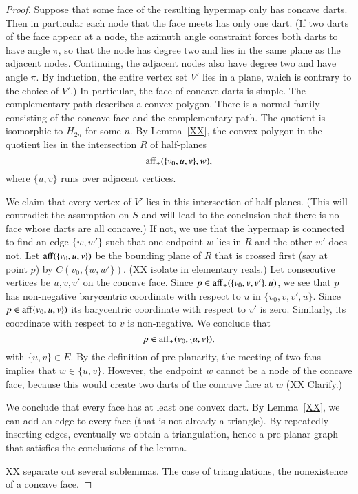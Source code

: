 \begin{proof}
Suppose that some face of the resulting hypermap only has concave darts.  Then
in particular each node that the face meets has only one dart.  (If two darts
of the face appear at a node, the azimuth angle constraint forces both darts to
have angle $\pi$, so that the node has degree two and lies in the same plane
as the adjacent nodes.  Continuing, the adjacent nodes also have degree two and
have angle $\pi$.  By induction, the entire vertex set $V'$ lies in a plane, which
is contrary to the choice of $V'$.)   In particular, the face of concave darts
is simple.   The complementary path describes a convex polygon.  There
is a normal family consisting of the concave face and the complementary path.
The quotient is isomorphic to $H_{2n}$ for some $n$.  By Lemma~\ref{XX}, the
convex polygon in the quotient lies in the intersection $R$ of half-planes
$$
{\operatorname{aff}}_+(\{v_0,u,v\},w),
$$
where $\{u,v\}$ runs over adjacent vertices.  

We claim that every vertex of $V'$ lies in this intersection of half-planes.
(This will contradict the assumption on $S$ and will lead to the conclusion that
there is no face whose darts are all concave.)
If not, we use that the hypermap is connected to find an edge $\{w,w'\}$ such
that one endpoint $w$ lies in $R$ and the other $w'$ does not.  
Let ${\operatorname{aff}}(\{v_0,u,v\})$ be the bounding plane of $R$ that 
is crossed first (say at point $p$) by
$C(v_0,\{w,w'\})$.  (XX isolate in elementary reals.)  
Let consecutive vertices be $u,v,v'$ on the concave face.  Since
$p\in {\operatorname{aff}}_+(\{v_0,v,v'\},u)$, we see that $p$ has non-negative barycentric
coordinate with respect to $u$ in $\{v_0,v,v',u\}$.  Since $p\in {\operatorname{aff}}\{v_0,u,v\})$
its barycentric coordinate with respect to $v'$ is zero.  Similarly, its
coordinate with respect to $v$ is non-negative.  We conclude that 
  $$p\in {\operatorname{aff}}_+(v_0,\{u,v\}),$$
with $\{u,v\}\in E$.  By the definition of pre-planarity, the meeting of two
fans implies that $w\in\{u,v\}$.
However, the endpoint $w$ cannot be a node of the concave face, because this would
create two darts of the concave face at $w$ (XX Clarify.)

We conclude that every face has at least one convex dart.  By Lemma~\ref{XX},
we can add an edge to every face (that is not already a triangle).  By repeatedly
inserting edges, eventually we obtain a triangulation, hence a pre-planar graph
that satisfies the conclusions of the lemma.

XX separate out several sublemmas.  The case of triangulations, the nonexistence
of a concave face.


\end{proof}
